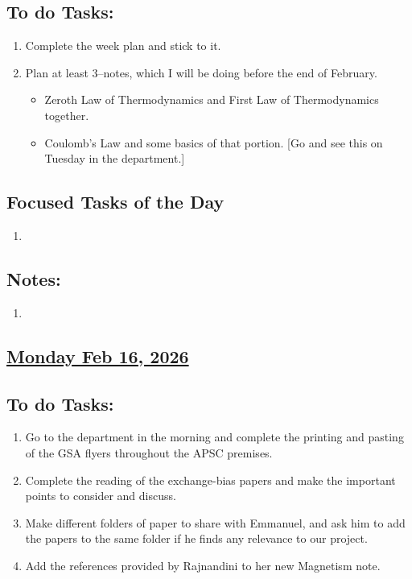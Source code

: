 \subsection*{To do Tasks:}
\begin{enumerate}
    \item Complete the week plan and stick to it. 
    \item Plan at least 3--notes, which I will be doing before the end of February. 
    \begin{itemize}
        \item Zeroth Law of Thermodynamics and First Law of Thermodynamics together.
        \item Coulomb's Law and some basics of that portion. [Go and see this on Tuesday in the  department.]
    \end{itemize}  
\end{enumerate}
\subsection*{Focused Tasks of the Day}
\begin{enumerate}[\ding{212}]  %
    \item 
\end{enumerate}
\subsection*{Notes:}
\begin{enumerate}
    \item 
\end{enumerate}
\subsection*{\underline{Monday Feb 16, 2026}}
\subsection*{To do Tasks:}
\begin{enumerate}
    \item Go to the department in the morning and complete the printing and pasting of the GSA flyers throughout the APSC premises. \cmark
    \item Complete the reading of the exchange-bias papers and make the important points to consider and discuss. 
    \item Make different folders of paper to share with Emmanuel, and ask him to add the papers to the same folder if he finds any relevance to our project.
    \item Add the references provided by Rajnandini to her new Magnetism note. \cmark 
\end{enumerate}
